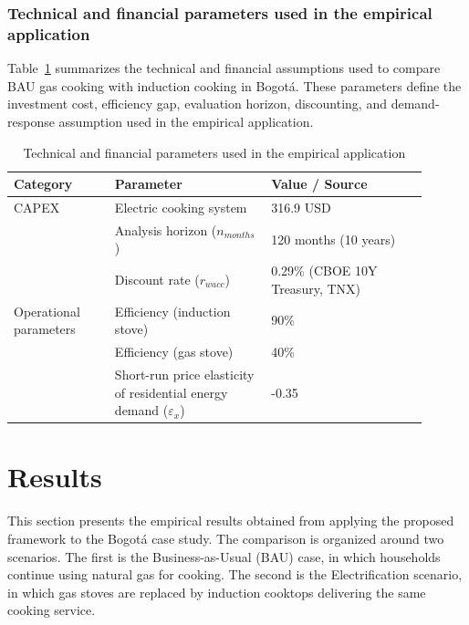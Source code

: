 \documentclass[authoryear,preprint,review,10pt]{elsarticle}
\begin{document}
\subsubsection{Technical and financial parameters used in the empirical application}

Table~\ref{tab:parameters} summarizes the technical and financial assumptions used to compare BAU gas cooking with induction cooking in Bogotá. These parameters define the investment cost, efficiency gap, evaluation horizon, discounting, and demand-response assumption used in the empirical application.

\begin{table}[H]
\centering
\caption{Technical and financial parameters used in the empirical application}
\label{tab:parameters}
\begin{tabular}{p{0.22\linewidth} p{0.34\linewidth} p{0.34\linewidth}}
\hline
\textbf{Category} & \textbf{Parameter} & \textbf{Value / Source} \\
\hline
CAPEX
& Electric cooking system
& 316.9 USD \citep{upme2018lena} \\
\hline
\multirow{5}{=}{Operational parameters}
& Analysis horizon ($n_{months}$)
& 120 months (10 years) \\
& Discount rate ($r_{wacc}$)
& 0.29\% (CBOE 10Y Treasury, TNX) \\
& Efficiency (induction stove)
& 90\% \citep{sadhu2010induction} \\
& Efficiency (gas stove)
& 40\% \citep{doe2008cooking} \\
& Short-run price elasticity of residential energy demand ($\varepsilon_x$)
& -0.35 \citep{espey2004turning} \\
\hline
\end{tabular}
\end{table}


\section{Results}
\label{results}

This section presents the empirical results obtained from applying the proposed framework to the Bogotá case study. The comparison is organized around two scenarios. The first is the Business-as-Usual (BAU) case, in which households continue using natural gas for cooking. The second is the Electrification scenario, in which gas stoves are replaced by induction cooktops delivering the same cooking service.
\end{document}
